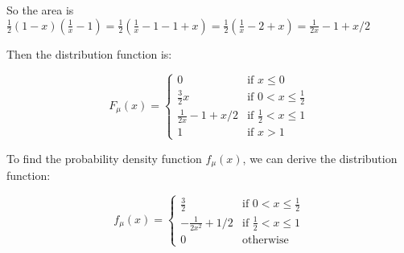 So the area is $\frac{1}{2} (1 - x) (\frac{1}{x} - 1) = \frac{1}{2} (\frac{1}{x}-1-1+x)
    = \frac{1}{2} (\frac{1}{x} - 2 + x) = \frac{1}{2x} - 1 + x/2$

Then the distribution function is:

\[ F_{\mu}(x) = \begin{cases}
        0                      & \text{if } x \leq 0               \\
        \frac{3}{2}x           & \text{if } 0 < x \leq \frac{1}{2} \\
        \frac{1}{2x} - 1 + x/2 & \text{if } \frac{1}{2} < x \leq 1 \\
        1                      & \text{if } x > 1
    \end{cases} \]

To find the probability density function $f_{\mu}(x)$, we can derive the
distribution function:

\[ f_{\mu}(x) = \begin{cases}
        \frac{3}{2}           & \text{if } 0 < x \leq \frac{1}{2} \\
        -\frac{1}{2x^2} + 1/2 & \text{if } \frac{1}{2} < x \leq 1 \\
        0                     & \text{otherwise}
    \end{cases} \]
